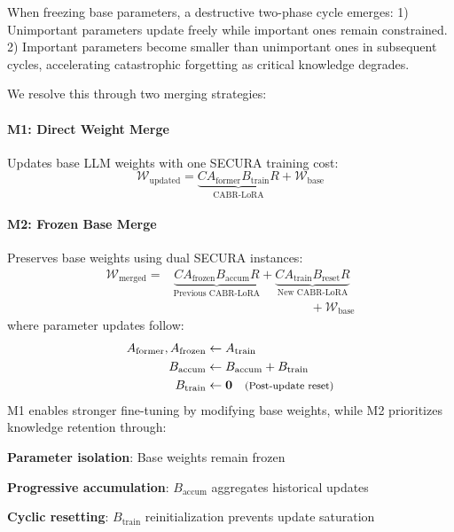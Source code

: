 When freezing base parameters, a destructive two-phase cycle emerges: 
1) Unimportant parameters update freely while important ones remain constrained. 
2) Important parameters become smaller than unimportant ones in subsequent cycles, accelerating catastrophic forgetting as critical knowledge degrades.

We resolve this through two merging strategies:
\paragraph{M1: Direct Weight Merge}
Updates base LLM weights with one SECURA training cost:
\begin{equation}
\mathcal{W}_{\text{updated}} = \underbrace{C A_{\text{former}} B_{\text{train}} R}_{\text{CABR-LoRA}} + \mathcal{W}_{\text{base}}
\end{equation}

\paragraph{M2: Frozen Base Merge} 
Preserves base weights using dual SECURA instances: 
\begin{equation}
\begin{split}
\mathcal{W}_{\text{merged}} =& \underbrace{C A_{\text{frozen}} B_{\text{accum}} R}_{\text{Previous CABR-LoRA}} + \underbrace{C A_{\text{train}} B_{\text{reset}} R}_{\text{New CABR-LoRA}} \\
&\hspace{11em} + \mathcal{W}_{\text{base}}
\end{split}
\end{equation}
where parameter updates follow:
\begin{align}
A_{\text{former}},A_{\text{frozen}} & \leftarrow A_{\text{train}} \\
B_{\text{accum}}                    & \leftarrow B_{\text{accum}} + B_{\text{train}} \\
B_{\text{train}}                    & \leftarrow \mathbf{0} 
                                      \quad \text{\footnotesize (Post-update reset)}
\end{align}
M1 enables stronger fine-tuning by modifying base weights, while M2 prioritizes knowledge retention through:
\begin{compactitem}
\item \textbf{Parameter isolation}: Base weights remain frozen
\item \textbf{Progressive accumulation}: $B_{\text{accum}}$ aggregates historical updates
\item \textbf{Cyclic resetting}: $B_{\text{train}}$ reinitialization prevents update saturation
\end{compactitem}

